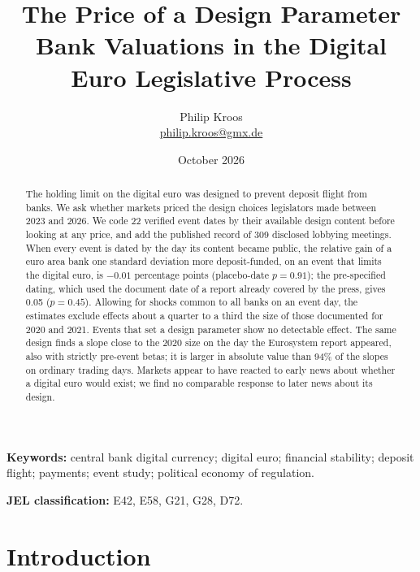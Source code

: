 \documentclass[11pt]{article}
\title{\bfseries The Price of a Design Parameter\\[3pt]
\large Bank Valuations in the Digital Euro Legislative Process}
\author{Philip Kroos\\[2pt]\normalsize\href{mailto:philip.kroos@gmx.de}{philip.kroos@gmx.de}}
\date{October 2026}
\theoremstyle{plain}\newtheorem{proposition}{Proposition}
\begin{document}
\maketitle
\thispagestyle{empty}

\begin{abstract}\noindent\normalsize
The holding limit on the digital euro was designed to prevent deposit flight from banks. We ask whether markets priced the design choices legislators made between 2023 and 2026. We code 22 verified event dates by their available design content before looking at any price, and add the published record of 309 disclosed lobbying meetings. When every event is dated by the day its content became public, the relative gain of a euro area bank one standard deviation more deposit-funded, on an event that limits the digital euro, is $-0.01$ percentage points (placebo-date $p=0.91$); the pre-specified dating, which used the document date of a report already covered by the press, gives 0.05 ($p=0.45$). Allowing for shocks common to all banks on an event day, the estimates exclude effects about a quarter to a third the size of those documented for 2020 and 2021. Events that set a design parameter show no detectable effect. The same design finds a slope close to the 2020 size on the day the Eurosystem report appeared, also with strictly pre-event betas; it is larger in absolute value than 94\% of the slopes on ordinary trading days. Markets appear to have reacted to early news about whether a digital euro would exist; we find no comparable response to later news about its design.
\end{abstract}

\vspace{0.6em}
\noindent\textbf{Keywords:} central bank digital currency; digital euro; financial stability; deposit flight; payments; event study; political economy of regulation.

\vspace{0.3em}
\noindent\textbf{JEL classification:} E42, E58, G21, G28, D72.

\clearpage
\setcounter{page}{1}

\section{Introduction}\label{sec:intro}
\end{document}
